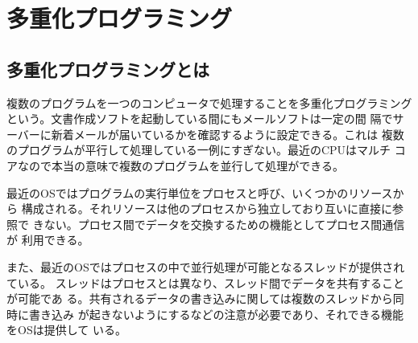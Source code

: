 \chapter{多重化プログラミング}
\section{多重化プログラミングとは}
複数のプログラムを一つのコンピュータで処理することを多重化プログラミング
という。文書作成ソフトを起動している間にもメールソフトは一定の間
隔でサーバーに新着メールが届いているかを確認するように設定できる。これは
複数のプログラムが平行して処理している一例にすぎない。最近のCPUはマルチ
コアなので本当の意味で複数のプログラムを並行して処理ができる。

最近のOSではプログラムの実行単位をプロセスと呼び、いくつかのリソースから
構成される。それリソースは他のプロセスから独立しており互いに直接に参照で
きない。プロセス間でデータを交換するための機能としてプロセス間通信が
利用できる。

また、最近のOSではプロセスの中で並行処理が可能となるスレッドが提供されている。
スレッドはプロセスとは異なり、スレッド間でデータを共有することが可能であ
る。共有されるデータの書き込みに関しては複数のスレッドから同時に書き込み
が起きないようにするなどの注意が必要であり、それできる機能をOSは提供して
いる。
